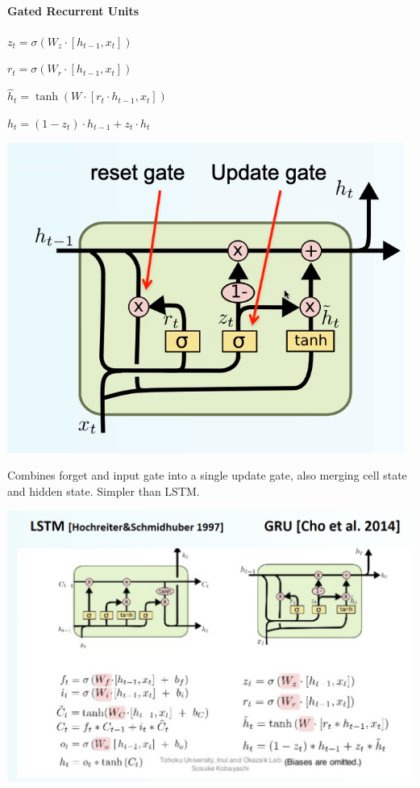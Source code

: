 \documentclass[10pt]{report}
\begin{document}
\paragraph{Gated Recurrent Units}
\begin{multicols}{2}
\begin{list}{}{}
	\item $z_t = \sigma(W_z\cdot[h_{t-1},x_t])$
	\item $r_t = \sigma(W_r\cdot[h_{t-1},x_t])$
	\item $\hat{h}_t = \tanh(W\cdot[r_t\cdot h_{t-1},x_t])$
	\item $h_t = (1-z_t)\cdot h_{t-1}+z_t\cdot\hat{h}_t$
\end{list}
\begin{center}
	\includegraphics[scale=0.5]{33.png}
\end{center}
\end{multicols}
Combines forget and input gate into a single update gate, also merging cell state and hidden state. Simpler than LSTM.
\begin{center}
	\includegraphics[scale=0.5]{34.png}
\end{center}
\end{document}
